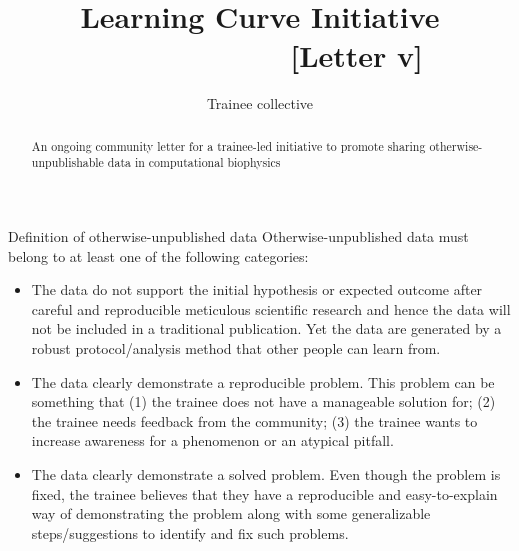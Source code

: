\documentclass[9pt,lessons]{livecoms}
\title{Learning Curve Initiative \ \ \ \ \ \ \ \ \ \ \ \ [Letter v\versionnumber]}
\author[1*]{Trainee collective}
\theoremstyle{definition}
\theoremstyle{remark}
\begin{document}
\begin{frontmatter}

\maketitle

\begin{abstract}
   An ongoing community letter for a trainee-led initiative to promote sharing otherwise-unpublishable data in computational biophysics
\end{abstract}

\end{frontmatter}


\begin{Checklists*}[h]

\begin{checklist}{Definition of otherwise-unpublished data}
Otherwise-unpublished data must belong to at least one of the following categories:
\begin{itemize}
\item The data do not support the initial hypothesis or expected outcome after careful and reproducible meticulous scientific research and hence the data will not be included in a traditional publication. Yet the data are generated by a robust protocol/analysis method that other people can 
learn from.
\item The data clearly demonstrate a reproducible problem. This problem can be something that (1) the trainee does not have a manageable solution for; (2) the trainee needs feedback from the community; (3) the trainee wants to increase awareness for a phenomenon or an atypical pitfall. 
\item The data clearly demonstrate a solved problem. Even though the problem is fixed, the trainee believes that they have a reproducible and easy-to-explain way of demonstrating the problem along with some generalizable steps/suggestions to identify and fix such problems.
\end{itemize}  
\end{checklist}

\end{Checklists*}
\end{document}
